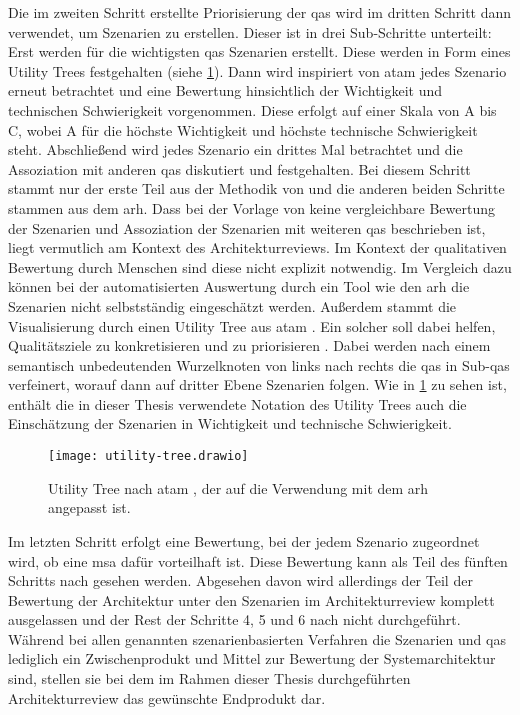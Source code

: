 Die im zweiten Schritt erstellte Priorisierung der \glspl{qa} wird im dritten Schritt dann verwendet, um Szenarien zu erstellen.
Dieser ist in drei Sub-Schritte unterteilt:
Erst werden für die wichtigsten \glspl{qa} Szenarien erstellt.
Diese werden in Form eines Utility Trees festgehalten (siehe \cref{fig:utility-tree}).
Dann wird inspiriert von \gls{atam} \cite{kazman_2000} jedes Szenario erneut betrachtet und eine Bewertung hinsichtlich der Wichtigkeit und technischen Schwierigkeit vorgenommen.
Diese erfolgt auf einer Skala von A bis C, wobei A für die höchste Wichtigkeit und höchste technische Schwierigkeit steht.
Abschließend wird jedes Szenario ein drittes Mal betrachtet und die Assoziation mit anderen \glspl{qa} diskutiert und festgehalten.
Bei diesem Schritt stammt nur der erste Teil aus der Methodik von  und die anderen beiden Schritte stammen aus dem \gls{arh}.
Dass bei der Vorlage von  keine vergleichbare Bewertung der Szenarien und Assoziation der Szenarien mit weiteren \glspl{qa} beschrieben ist, liegt vermutlich am Kontext des Architekturreviews.
Im Kontext der qualitativen Bewertung durch Menschen sind diese nicht explizit notwendig.
Im Vergleich dazu können bei der automatisierten Auswertung durch ein Tool wie den \gls{arh} die Szenarien nicht selbstständig eingeschätzt werden.
Außerdem stammt die Visualisierung durch einen Utility Tree aus \gls{atam} \cite{kazman_2000}.
Ein solcher soll dabei helfen, Qualitätsziele zu konkretisieren und zu priorisieren \cite{kazman_2000}.
Dabei werden nach einem semantisch unbedeutenden Wurzelknoten von links nach rechts die \glspl{qa} in Sub-\glspl{qa} verfeinert, worauf dann auf dritter Ebene Szenarien folgen.
Wie in \cref{fig:utility-tree} zu sehen ist, enthält die in dieser Thesis verwendete Notation des Utility Trees auch die Einschätzung der Szenarien in Wichtigkeit und technische Schwierigkeit.
\begin{figure}[!h]
	\centering
	\texttt{[image: utility-tree.drawio]}
	\caption[Utility Tree nach \acrshort{atam}]{
		Utility Tree nach \gls{atam} \cite{kazman_2000}, der auf die Verwendung mit dem \gls{arh} angepasst ist.
	}
	\label{fig:utility-tree}
\end{figure}


Im letzten Schritt erfolgt eine Bewertung, bei der jedem Szenario zugeordnet wird, ob eine \gls{msa} dafür vorteilhaft ist.
Diese Bewertung kann als Teil des fünften Schritts nach  gesehen werden.
Abgesehen davon wird allerdings der Teil der Bewertung der Architektur unter den Szenarien im Architekturreview komplett ausgelassen und der Rest der Schritte 4, 5 und 6 nach  nicht durchgeführt.
Während bei allen genannten szenarienbasierten Verfahren die Szenarien und \glspl{qa} lediglich ein Zwischenprodukt und Mittel zur Bewertung der Systemarchitektur sind, stellen sie bei dem im Rahmen dieser Thesis durchgeführten Architekturreview das gewünschte Endprodukt dar.

